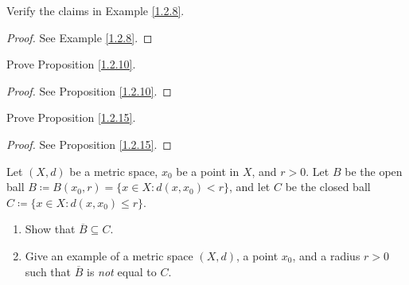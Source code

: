 \exercisesection

\begin{exercise}\label{ex 1.2.1}
    Verify the claims in Example \ref{1.2.8}.
\end{exercise}

\begin{proof}
    See Example \ref{1.2.8}.
\end{proof}

\begin{exercise}\label{ex 1.2.2}
    Prove Proposition \ref{1.2.10}.
\end{exercise}

\begin{proof}
    See Proposition \ref{1.2.10}.
\end{proof}

\begin{exercise}\label{ex 1.2.3}
    Prove Proposition \ref{1.2.15}.
\end{exercise}

\begin{proof}
    See Proposition \ref{1.2.15}.
\end{proof}

\begin{exercise}\label{ex 1.2.4}
    Let \((X, d)\) be a metric space, \(x_0\) be a point in \(X\), and \(r > 0\).
    Let \(B\) be the open ball \(B \coloneqq B(x_0, r) = \{x \in X : d(x, x_0) < r\}\), and let \(C\) be the closed ball \(C \coloneqq \{x \in X : d(x, x_0) \leq r\}\).
    \begin{enumerate}
        \item Show that \(\overline{B} \subseteq C\).
        \item Give an example of a metric space \((X, d)\), a point \(x_0\), and a radius \(r > 0\) such that \(\overline{B}\) is \emph{not} equal to \(C\).
    \end{enumerate}
\end{exercise}

